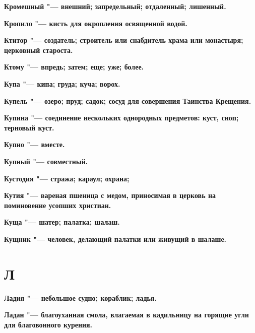 \begin{mymulticols}{2}
\bfseries Кромешный\normalfont{} "--- внешний; запредельный; отдаленный; лишенный. 




\bfseries Кропило\normalfont{} "--- кисть для окропления освященной водой. 




\bfseries Ктитор\normalfont{} "--- создатель; строитель или снабдитель храма или монастыря; церковный староста. 




\bfseries Ктому\normalfont{} "--- впредь; затем; еще; уже; более. 




\bfseries Купа\normalfont{} "--- кипа; груда; куча; ворох. 




\bfseries Купель\normalfont{} "--- озеро; пруд; садок; сосуд для совершения Таинства Крещения. 




\bfseries Купина\normalfont{} "--- соединение нескольких однородных предметов: куст, сноп; терновый куст. 




\bfseries Купно\normalfont{} "--- вместе. 




\bfseries Купный\normalfont{} "--- совместный. 




\bfseries Кустодия\normalfont{} "--- стража; караул; охрана; 




\bfseries Кутия\normalfont{} "--- вареная пшеница с медом, приносимая в церковь на поминовение усопших христиан. 




\bfseries Куща\normalfont{} "--- шатер; палатка; шалаш. 




\bfseries Кущник\normalfont{} "--- человек, делающий палатки или живущий в шалаше. 




\section{Л}





\bfseries Ладия\normalfont{} "--- небольшое судно; кораблик; ладья. 




\bfseries Ладан\normalfont{} "--- благоуханная смола, влагаемая в кадильницу на горящие угли для благовонного курения. 





\end{mymulticols}
